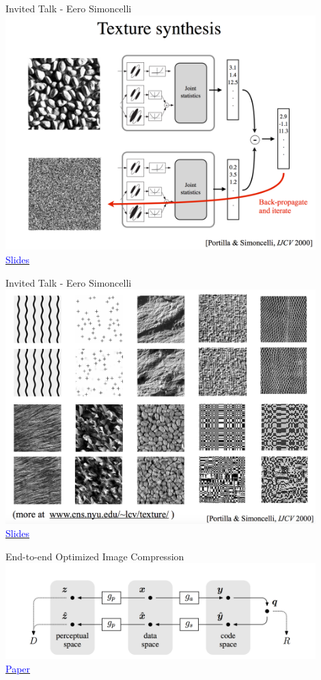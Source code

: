 \documentclass[]{beamer}
\begin{document}
\begin{frame}{Invited Talk - Eero Simoncelli}
\centering
\includegraphics[width=0.9\textwidth]{figures/simoncelli-texture-synthesis} \\
\href{http://iclr.cc/lib/exe/fetch.php?media=iclr2017:simoncelli\_iclr2017.pdf}{\textcolor{blue}{Slides}}
\end{frame}

\begin{frame}{Invited Talk - Eero Simoncelli}
\centering
\includegraphics[width=0.9\textwidth]{figures/simoncelli-texture-synthesis-examples} \\
\href{http://iclr.cc/lib/exe/fetch.php?media=iclr2017:simoncelli\_iclr2017.pdf}{\textcolor{blue}{Slides}}
\end{frame}

\begin{frame}{End-to-end Optimized Image Compression}
\centering
\includegraphics[width=0.9\textwidth]{figures/balle-framework} \\
\href{https://openreview.net/forum?id=rJxdQ3jeg}{\textcolor{blue}{Paper}}
\end{frame}
\end{document}
